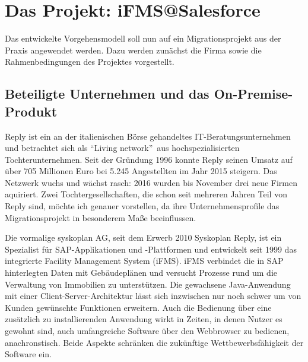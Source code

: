 \section{Das Projekt: iFMS@Salesforce}
\label{cha:result}

Das entwickelte Vorgehensmodell soll nun auf ein Migrationsprojekt aus der 
Praxis angewendet werden. Dazu werden zunächst die Firma sowie die 
Rahmenbedingungen des Projektes vorgestellt. 

\subsection{Beteiligte Unternehmen und das On-Premise-Produkt}


Reply ist ein an der italienischen Börse gehandeltes 
IT-Beratungsunternehmen und betrachtet sich als "`Living network"'\ aus 
hochspezialisierten Tochterunternehmen. Seit der Gründung 1996 konnte Reply 
seinen Umsatz auf über 705 Millionen Euro bei 5.245 Angestellten im Jahr 2015 
steigern. Das Netzwerk wuchs und wächst rasch: 2016 wurden bis November drei 
neue Firmen aquiriert. Zwei Tochtergesellschaften, die schon seit mehreren 
Jahren Teil von Reply sind, 
möchte ich genauer vorstellen, da ihre Unternehmensprofile das 
Migrationsprojekt in besonderem Maße beeinflussen.

Die vormalige syskoplan AG, seit dem Erwerb 2010  
Syskoplan Reply, ist ein Spezialist für SAP-Applikationen und 
-Plattformen  und entwickelt seit 1999 das 
integrierte Facility Management System (iFMS). iFMS verbindet die in SAP 
hinterlegten Daten mit Gebäudeplänen und versucht Prozesse rund um die 
Verwaltung von Immobilien zu unterstützen. Die gewachsene 
Java-Anwendung mit einer Client-Server-Architektur lässt sich inzwischen nur 
noch schwer um von Kunden gewünschte Funktionen erweitern. Auch die Bedienung 
über 
eine zusätzlich zu installierenden Anwendung wirkt in Zeiten, in denen Nutzer 
es gewohnt sind, auch umfangreiche Software über den Webbrowser zu bedienen, 
anachronstisch. Beide Aspekte schränken die zukünftige
Wettbewerbsfähigkeit der Software ein. 

